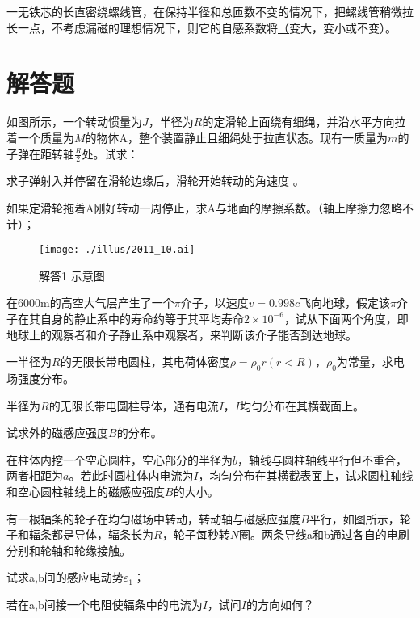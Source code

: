 一无铁芯的长直密绕螺线管，在保持半径和总匝数不变的情况下，把螺线管稍微拉长一点，不考虑漏磁的理想情况下，则它的自感系数将\ul（变大，变小或不变）。


\section{解答题}%
如图所示，一个转动惯量为$J$，半径为$R$的定滑轮上面绕有细绳，并沿水平方向拉着一个质量为$M$的物体A，整个装置静止且细绳处于拉直状态。现有一质量为$m$的子弹在距转轴$\frac{R}{2}$处。试求：

求子弹射入并停留在滑轮边缘后，滑轮开始转动的角速度 。

如果定滑轮拖着A刚好转动一周停止，求A与地面的摩擦系数。（轴上摩擦力忽略不计）；

\begin{figure}
	\begin{flushright}
		\texttt{[image: ./illus/2011\_10.ai]}
		\caption{解答1 示意图}
	\end{flushright}
\end{figure}

在6000m的高空大气层产生了一个$\pi$介子，以速度$v=0.998c$飞向地球，假定该$\pi$介子在其自身的静止系中的寿命约等于其平均寿命$2\times 10^{-6}$，试从下面两个角度，即地球上的观察者和介子静止系中观察者，来判断该介子能否到达地球。

一半径为$R$的无限长带电圆柱，其电荷体密度$\rho=\rho_0r(r<R)$，$\rho_0$为常量，求电场强度分布。

半径为$R$的无限长带电圆柱导体，通有电流$I$，$I$均匀分布在其横截面上。

试求外的磁感应强度$B$的分布。

在柱体内挖一个空心圆柱，空心部分的半径为$b$，轴线与圆柱轴线平行但不重合，两者相距为$a$。若此时圆柱体内电流为$I$，均匀分布在其横截表面上，试求圆柱轴线和空心圆柱轴线上的磁感应强度$B$的大小。

有一根辐条的轮子在均匀磁场中转动，转动轴与磁感应强度$B$平行，如图所示，轮子和辐条都是导体，辐条长为$R$，轮子每秒转$N$圈。两条导线a和b通过各自的电刷分别和轮轴和轮缘接触。

试求a,b间的感应电动势$\varepsilon_1$；

若在a,b间接一个电阻使辐条中的电流为$I$，试问$I$的方向如何？

